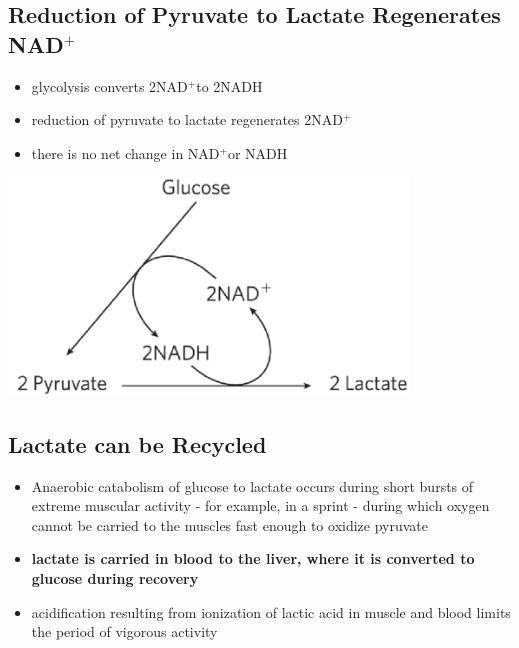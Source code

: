 \documentclass[10pt]{article}
\newcommand{\pc}{$^+$}
\begin{document}
\subsection*{Reduction of Pyruvate to Lactate Regenerates NAD\pc}
\begin{itemize}
	\item glycolysis converts 2NAD\pc to 2NADH
	\item reduction of pyruvate to lactate regenerates 2NAD\pc
	\item there is no net change in NAD\pc or NADH
\end{itemize}
\begin{center} 
	\includegraphics*[width=0.8\textwidth]{L2_11.png}
\end{center}

\subsection*{Lactate can be Recycled}
\begin{itemize}
	\item Anaerobic catabolism of glucose to lactate occurs during short bursts of extreme muscular activity - for example, in a sprint - during which oxygen cannot be carried to the muscles fast enough to oxidize pyruvate
	\item \textbf{lactate is carried in blood to the liver, where it is converted to glucose during recovery}
	\item acidification resulting from ionization of lactic acid in muscle and blood limits the period of vigorous activity
\end{itemize}
\end{document}
